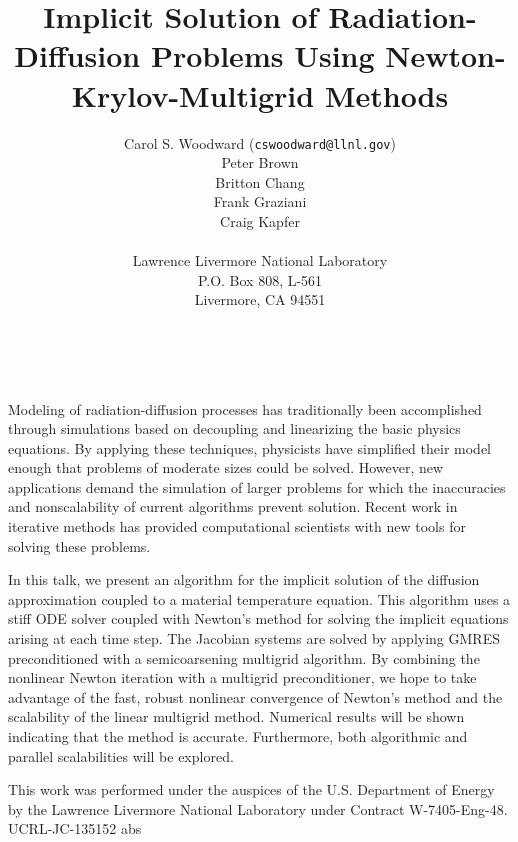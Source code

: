 \documentclass[11pt]{article}
\date{ ~ \hspace{-4mm}}
\title{Implicit Solution of Radiation-Diffusion Problems Using  Newton-Krylov-Multigrid Methods  }
\author{Carol S. Woodward ({\tt cswoodward@llnl.gov}) \\ Peter Brown \\ Britton Chang \\ Frank Graziani  \\ Craig Kapfer \\ \\ Lawrence Livermore National Laboratory \\ P.O. Box 808, L-561 \\ Livermore, CA  94551}
\begin{document}
\maketitle
\thispagestyle{empty}





 



Modeling of radiation-diffusion processes has traditionally been 
accomplished through simulations based on decoupling and linearizing
the basic physics equations.  By applying these techniques, 
physicists have simplified their model enough that problems of
moderate sizes could be solved.  However, new applications demand
the simulation of larger problems for which the inaccuracies and 
nonscalability of current algorithms prevent solution.  Recent work 
in iterative methods has provided computational scientists with 
new tools for solving these problems.  



In this talk, we present an algorithm for the implicit solution 
of the diffusion approximation coupled to a material temperature 
equation.  This algorithm uses a stiff ODE solver coupled with 
Newton's method for solving the implicit equations arising at 
each time step.  The Jacobian systems are solved by applying 
GMRES preconditioned with a semicoarsening multigrid algorithm.  
By combining the nonlinear Newton iteration with a multigrid 
preconditioner, we hope to take advantage of the fast, robust 
nonlinear convergence of Newton's method and the scalability 
of the linear multigrid method.  Numerical results will be 
shown indicating that the method is accurate.  Furthermore, 
both algorithmic and parallel scalabilities will be explored.



This work was performed under the auspices of the U.S. Department of 
Energy by the Lawrence Livermore National Laboratory under 
Contract W-7405-Eng-48. UCRL-JC-135152 abs
\end{document}
